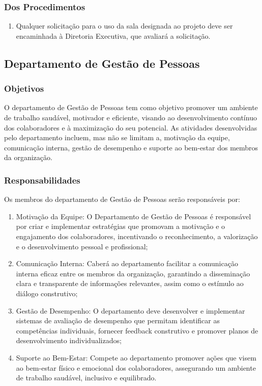         {\color{red} 
        \subsubsection{Dos Procedimentos}
            \begin{enumerate}
                \item Qualquer solicitação para o uso da sala designada ao projeto deve ser encaminhada à Diretoria Executiva, que avaliará a solicitação.
            \end{enumerate}
        }
    {\color{red}
    \subsection{Departamento de Gestão de Pessoas}
        \subsubsection{Objetivos}
            O departamento de Gestão de Pessoas tem como objetivo promover um ambiente de trabalho saudável, motivador e eficiente, visando ao desenvolvimento contínuo dos colaboradores e à maximização do seu potencial. As atividades desenvolvidas pelo departamento incluem, mas não se limitam a, motivação da equipe, comunicação interna, gestão de desempenho e suporte ao bem-estar dos membros da organização.
        \subsubsection{Responsabilidades}
            Os membros do departamento de Gestão de Pessoas serão responsáveis por:
            \begin{enumerate}
                \item Motivação da Equipe: O Departamento de Gestão de Pessoas é responsável por criar e implementar estratégias que promovam a motivação e o engajamento dos colaboradores, incentivando o reconhecimento, a valorização e o desenvolvimento pessoal e profissional;
                \item Comunicação Interna: Caberá ao departamento facilitar a comunicação interna eficaz entre os membros da organização, garantindo a disseminação clara e transparente de informações relevantes, assim como o estímulo ao diálogo construtivo;
                \item Gestão de Desempenho: O departamento deve desenvolver e implementar sistemas de avaliação de desempenho que permitam identificar as competências individuais, fornecer feedback construtivo e promover planos de desenvolvimento individualizados;
                \item  Suporte ao Bem-Estar: Compete ao departamento promover ações que visem ao bem-estar físico e emocional dos colaboradores, assegurando um ambiente de trabalho saudável, inclusivo e equilibrado.
            \end{enumerate}
        
}
